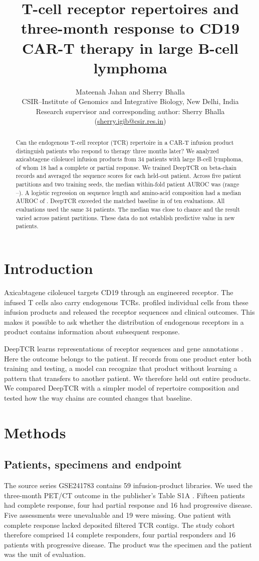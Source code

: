 \documentclass[11pt]{article}
\title{T-cell receptor repertoires and three-month response to CD19 CAR-T therapy in large B-cell lymphoma}
\author{Mateenah Jahan and Sherry Bhalla\\[3pt]
\small CSIR--Institute of Genomics and Integrative Biology, New Delhi, India\\
\small Research supervisor and corresponding author: Sherry Bhalla (\href{mailto:sherry.igib@csir.res.in}{sherry.igib@csir.res.in})}
\date{}
\begin{document}
\maketitle
\begin{abstract}
Can the endogenous T-cell receptor (TCR) repertoire in a CAR-T infusion product distinguish patients who respond to therapy three months later? We analyzed axicabtagene ciloleucel infusion products from 34 patients with large B-cell lymphoma, of whom 18 had a complete or partial response. We trained DeepTCR on beta-chain records and averaged the sequence scores for each held-out patient. Across five patient partitions and two training seeds, the median within-fold patient AUROC was \DeepMedian{} (range \DeepLow{}--\DeepHigh{}). A logistic regression on sequence length and amino-acid composition had a median AUROC of \BaseMedian{}. DeepTCR exceeded the matched baseline in \Above{} of ten evaluations. All evaluations used the same 34 patients. The median was close to chance and the result varied across patient partitions. These data do not establish predictive value in new patients.
\end{abstract}

\section{Introduction}
Axicabtagene ciloleucel targets CD19 through an engineered receptor. The infused T cells also carry endogenous TCRs. \citet{li2023atlas} profiled individual cells from these infusion products and released the receptor sequences and clinical outcomes. This makes it possible to ask whether the distribution of endogenous receptors in a product contains information about subsequent response.

DeepTCR learns representations of receptor sequences and gene annotations \citep{sidhom2021deeptcr}. Here the outcome belongs to the patient. If records from one product enter both training and testing, a model can recognize that product without learning a pattern that transfers to another patient. We therefore held out entire products. We compared DeepTCR with a simpler model of repertoire composition and tested how the way chains are counted changes that baseline.

\section{Methods}
\subsection{Patients, specimens and endpoint}
The source series GSE241783 contains 59 infusion-product libraries. We used the three-month PET/CT outcome in the publisher's Table S1A \citep{li2023atlas}. Fifteen patients had complete response, four had partial response and 16 had progressive disease. Five assessments were unevaluable and 19 were missing. One patient with complete response lacked deposited filtered TCR contigs. The study cohort therefore comprised 14 complete responders, four partial responders and 16 patients with progressive disease. The product was the specimen and the patient was the unit of evaluation.
\end{document}
